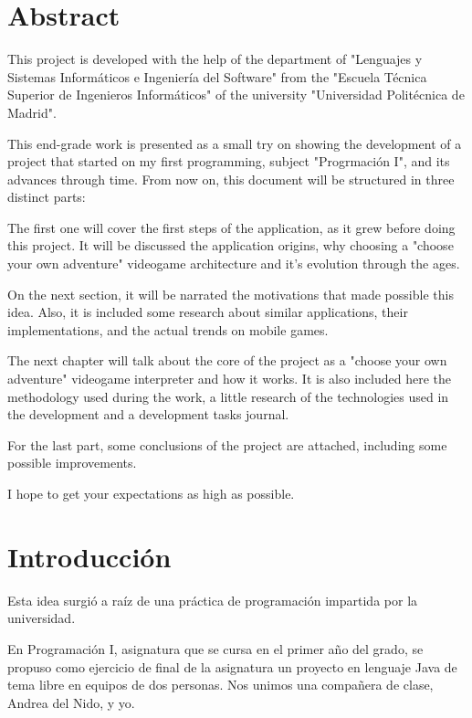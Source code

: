 \documentclass[12pt]{article}
\begin{document}
\newpage

\section{Abstract}
\onehalfspace

This project is developed with the help of the department of "Lenguajes y Sistemas Inform\'aticos e Ingenier\'ia del Software" from the "Escuela T\'ecnica Superior de Ingenieros Inform\'aticos" of the university "Universidad Politécnica de Madrid".

This end-grade work is presented as a small try on showing the development of a project that started on my first programming, subject "Progrmación I", and its advances through time.
From now on, this document will be structured in three distinct parts:

The first one will cover the first steps of the application, as it grew before doing this project. It will be discussed the application origins, why choosing a "choose your own adventure" videogame architecture and it's evolution through the ages. 

On the next section, it will be narrated the motivations that made possible this idea. Also, it is included some research about similar applications, their implementations, and the actual trends on mobile games.

The next chapter will talk about the core of the project as a "choose your own adventure" videogame interpreter and how it works. It is also included here the methodology used during the work, a little research of the technologies used in the development and a development tasks journal.

For the last part, some conclusions of the project are attached, including some possible improvements.

I hope to get your expectations as high as possible.

\newpage
\section{Introducción}
\onehalfspace

Esta idea surgió a raíz de una práctica de programación impartida por la universidad.

En Programación I, asignatura que se cursa en el primer año del grado, se propuso como ejercicio de final de la asignatura un proyecto en lenguaje Java de tema libre en equipos de dos personas. Nos unimos una compañera de clase, Andrea del Nido, y yo. 
\end{document}

